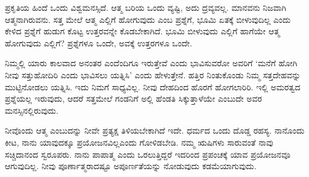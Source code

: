 ಪ್ರಕೃತಿಯ ಹಿಂದೆ ಒಂದು ವಿಶ್ವಮನಸ್ಸಿದೆ. ಆತ್ಮ ಬರಿಯ ಒಂದು ವ್ಯಷ್ಟಿ, ಅದು ದ್ರವ್ಯವಲ್ಲ. ಮಾನವನು ನಿಜವಾಗಿ ಆತ್ಮನಾಗಿರುವನು. ಸತ್ತ ಮೇಲೆ ಆತ್ಮ ಎಲ್ಲಿಗೆ ಹೋಗುವುದು ಎಂಬ ಪ್ರಶ್ನೆಗೆ, ಭೂಮಿ ಏತಕ್ಕೆ ಬೀಳುವುದಿಲ್ಲ ಎಂದು ಕೇಳಿದ ಪ್ರಶ್ನೆಗೆ ಹುಡುಗ ಕೊಟ್ಟ ಉತ್ತರವನ್ನೇ ಕೊಡಬೇಕಾಗಿದೆ. ಭೂಮಿ ಬೀಳುವುದು ಎಲ್ಲಿಗೆ ಹಾಗೆಯೇ ಆತ್ಮ ಹೋಗುವುದು ಎಲ್ಲಿಗೆ? ಪ್ರಶ್ನೆಗಳೂ ಒಂದೇ, ಅವಕ್ಕೆ ಉತ್ತರಗಳೂ ಒಂದೇ.

ನಿಮ್ಮಲ್ಲಿ ಯಾರು ಕಾಲವಾದ ಅನಂತರ ಎಂದೆಂದಿಗೂ ಇರುತ್ತೇವೆ ಎಂದು ಭಾವಿಸುವರೋ ಅವರಿಗೆ ‘ಮನೆಗೆ ಹೋಗಿ ನೀವು ಸತ್ತುಹೋದಿರಿ ಎಂದು ಭಾವಿಸಲು ಯತ್ನಿಸಿ’ ಎಂದು ಹೇಳುತ್ತೇನೆ. ಹತ್ತಿರ ನಿಂತುಕೊಂಡು ನಿಮ್ಮ ಸತ್ತದೇಹವನ್ನು ಮುಟ್ಟಿನೋಡಲು ಯತ್ನಿಸಿ. ಇದು ನಿಮಗೆ ಸಾಧ್ಯವಿಲ್ಲ. ನೀವು ದೇಹದಿಂದ ಹೊರಗೆ ಹೋಗಲಾರಿರಿ. ಇಲ್ಲಿ ಅಮರತ್ವದ ಪ್ರಶ್ನೆಯಲ್ಲ ಇರುವುದು, ಆದರೆ ಸತ್ತಮೇಲೆ ಗಂಡನಿಗೆ ಅಲ್ಲಿ ಹೆಂಡತಿ ಸಿಕ್ಕುತ್ತಾಳೆಯೇ ಎಂಬುದೇ ಅವರ ಮನಸ್ಸಿನಲ್ಲಿರುವುದು.

ನೀವೊಂದು ಆತ್ಮ ಎಂಬುದನ್ನು ನೀವೇ ಪ್ರತ್ಯಕ್ಷ ತಿಳಿಯಬೇಕಾಗಿದೆ ಇದೇ. ಧರ್ಮದ ಒಂದು ದೊಡ್ಡ ರಹಸ್ಯ. ನಾನೊಂದು ಕೀಟ, ನಾನು ಯಾವುದಕ್ಕೂ ಪ್ರಯೋಜನವಿಲ್ಲ\break ಎಂದು ಗೋಳಿಡಬೇಡಿ. ನಮ್ಮ ಋಷಿಗಳು ಸಾರುವಂತೆ ನಾವು ಸಚ್ಚಿದಾನಂದ ಸ್ವರೂಪರು. ನಾನು ಪಾಪಾತ್ಮ ಎಂದು ಒರಲುತ್ತಿದ್ದರೆ ಇದರಿಂದ ಪ್ರಪಂಚಕ್ಕೆ ಯಾವ ಪ್ರಯೋಜನವೂ ಆಗುವುದಿಲ್ಲ. ನೀವು ಪೂರ್ಣಾತ್ಮರಾದಷ್ಟೂ ಅಪೂರ್ಣತೆಯನ್ನು ನೋಡುವುದು ಕಡಮೆಯಾಗುವುದು.

